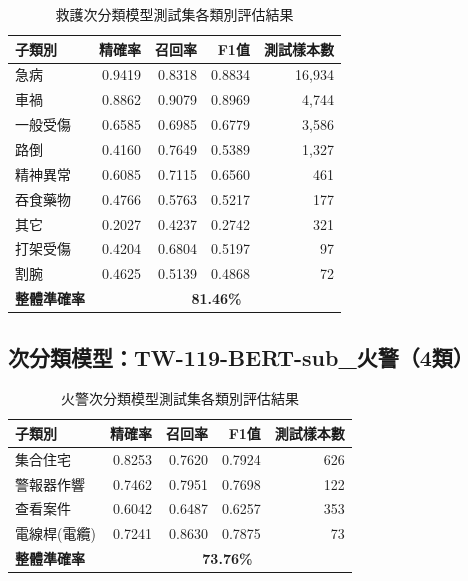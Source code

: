 \documentclass[UTF8,a4paper,11pt]{ctexart}
\begin{document}
\begin{table}[htbp]
  \centering
  \caption{救護次分類模型測試集各類別評估結果}
  \label{tab:sub-jiuhu}
  \small
  \begin{tabular}{lrrrr}
    \toprule
    子類別 & 精確率 & 召回率 & F1值 & 測試樣本數 \\
    \midrule
    急病     & 0.9419 & 0.8318 & 0.8834 & 16,934 \\
    車禍     & 0.8862 & 0.9079 & 0.8969 &  4,744 \\
    一般受傷 & 0.6585 & 0.6985 & 0.6779 &  3,586 \\
    路倒     & 0.4160 & 0.7649 & 0.5389 &  1,327 \\
    精神異常 & 0.6085 & 0.7115 & 0.6560 &    461 \\
    吞食藥物 & 0.4766 & 0.5763 & 0.5217 &    177 \\
    其它     & 0.2027 & 0.4237 & 0.2742 &    321 \\
    打架受傷 & 0.4204 & 0.6804 & 0.5197 &     97 \\
    割腕     & 0.4625 & 0.5139 & 0.4868 &     72 \\
    \midrule
    \textbf{整體準確率} & \multicolumn{4}{c}{\textbf{81.46\%}} \\
    \bottomrule
  \end{tabular}
\end{table}

\subsection{次分類模型：TW-119-BERT-sub\_火警（4類）}

\begin{table}[htbp]
  \centering
  \caption{火警次分類模型測試集各類別評估結果}
  \label{tab:sub-huojing}
  \begin{tabular}{lrrrr}
    \toprule
    子類別 & 精確率 & 召回率 & F1值 & 測試樣本數 \\
    \midrule
    集合住宅       & 0.8253 & 0.7620 & 0.7924 & 626 \\
    警報器作響     & 0.7462 & 0.7951 & 0.7698 & 122 \\
    查看案件       & 0.6042 & 0.6487 & 0.6257 & 353 \\
    電線桿(電纜)   & 0.7241 & 0.8630 & 0.7875 &  73 \\
    \midrule
    \textbf{整體準確率} & \multicolumn{4}{c}{\textbf{73.76\%}} \\
    \bottomrule
  \end{tabular}
\end{table}
\end{document}
